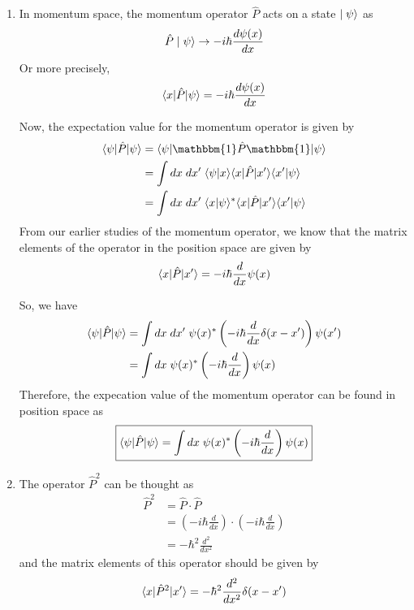 \documentclass[twoside]{article}
\begin{document}
\begin{enumerate}
   \item In momentum space, the momentum operator $\hat{P}$ acts on a state $\mid\psi\rangle$ as 
   \[ \hat{P}\mid\psi\rangle \rightarrow -i\hbar \frac{d\psi(x)}{dx} \]
   Or more precisely,
   \[ \langle x | \hat{P}|\psi \rangle = -i\hbar \frac{d\psi(x)}{dx} \]

   Now, the expectation value for the momentum operator is given by 
   \begin{align*}
      \inner{\psi}{\hat{P}|\psi} &= \inner{\psi}{\mathbbm{1}\hat{P}\mathbbm{1}|\psi} \\
                                 &= \int dx\;dx'\;\inner{\psi}{x} \inner{x}{\hat{P}|x'} \inner{x'}{\psi} \\
                                 &= \int dx\;dx'\; \inner{x}{\psi}^{*} \inner{x}{\hat{P}|x'} \inner{x'}{\psi}
   \end{align*}
   From our earlier studies of the momentum operator, we know that the matrix elements of the operator in the position space are given by 
   \[ \langle x | \hat{P}|x' \rangle = -i\hbar\frac{d}{dx}\psi(x) \]

   So, we have 
   \begin{align*}
      \langle \psi | \hat{P}|\psi \rangle &= \int dx\;dx'\; \psi(x)^{*} \left( -i\hbar \frac{d}{dx} \delta(x-x') \right) \psi(x') \\
                                 &= \int dx\; \psi(x)^{*} \left( -i\hbar\frac{d}{dx} \right) \psi(x)
   \end{align*}
   Therefore, the expecation value of the momentum operator can be found in position space as 
   \[ \boxed{\langle \psi | \hat{P}|\psi \rangle = \int dx\; \psi(x)^{*} \left( -i\hbar\frac{d}{dx} \right) \psi(x)} \]

   \item The operator $\hat{P}^2$ can be thought as 
   \begin{align*}
      \hat{P}^2 &= \hat{P} \cdot \hat{P} \\
                &= \left( -i\hbar\frac{d}{dx} \right) \cdot \left( -i\hbar\frac{d}{dx} \right) \\ 
                &= -\hbar^2 \frac{d^2}{dx^2}
   \end{align*}
   and the matrix elements of this operator should be given by 
   \[ \langle x | \hat{P}^2|x' \rangle = -\hbar^2 \frac{d^2}{dx^2} \delta(x-x') \]


\end{enumerate}
\end{document}
